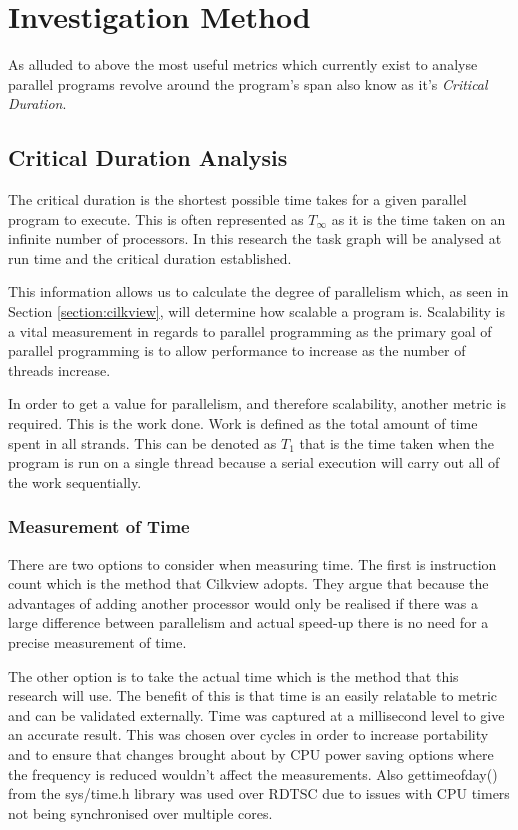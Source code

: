 \section{Investigation Method}

As alluded to above the most useful metrics which currently exist to analyse parallel programs revolve around the program's span also know as it's \emph{Critical Duration}.

\subsection{Critical Duration Analysis}

The critical duration is the shortest possible time takes for a given parallel program to execute. This is often represented as \(T_\infty\) as it is the time taken on an infinite number of processors. In this research the task graph will be analysed at run time and the critical duration established. 

This information allows us to calculate the degree of parallelism which, as seen in Section \ref{section:cilkview}, will determine how scalable a program is. Scalability is a vital measurement in regards to parallel programming as the primary goal of parallel programming is to allow performance to increase as the number of threads increase. 

In order to get a value for parallelism, and therefore scalability, another metric is required. This is the work done. Work is defined as the total amount of time spent in all strands. This can be denoted as \(T_1\) that is the time taken when the program is run on a single thread because a serial execution will carry out all of the work sequentially.

\subsubsection{Measurement of Time}

There are two options to consider when measuring time. The first is instruction count which is the method that Cilkview \cite{id8} adopts. They argue that because the advantages of adding another processor would only be realised if there was a large difference between parallelism and actual speed-up there is no need for a precise measurement of time. 

The other option is to take the actual time which is the method that this research will use. The benefit of this is that time is an easily relatable to metric and can be validated externally. Time was captured at a millisecond level to give an accurate result. This was chosen over cycles in order to increase portability and to ensure that changes brought about by CPU power saving options where the frequency is reduced wouldn't affect the measurements. Also gettimeofday() from the sys/time.h library was used over RDTSC \cite{id22} due to issues with CPU timers not being synchronised over multiple cores. 

